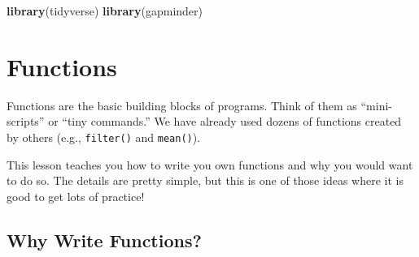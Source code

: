 \documentclass[
]{book}
\newenvironment{Shaded}{\begin{snugshade}}{\end{snugshade}}
\newcommand{\CommentTok}[1]{\textcolor[rgb]{0.56,0.35,0.01}{\textit{#1}}}
\newcommand{\DataTypeTok}[1]{\textcolor[rgb]{0.13,0.29,0.53}{#1}}
\newcommand{\DecValTok}[1]{\textcolor[rgb]{0.00,0.00,0.81}{#1}}
\newcommand{\KeywordTok}[1]{\textcolor[rgb]{0.13,0.29,0.53}{\textbf{#1}}}
\newcommand{\NormalTok}[1]{#1}
\newcommand{\OperatorTok}[1]{\textcolor[rgb]{0.81,0.36,0.00}{\textbf{#1}}}
\newcommand{\StringTok}[1]{\textcolor[rgb]{0.31,0.60,0.02}{#1}}
\begin{document}
\begin{Shaded}
\end{Shaded}

\begin{Shaded}
\begin{Highlighting}[]
\KeywordTok{library}\NormalTok{(tidyverse)}
\KeywordTok{library}\NormalTok{(gapminder)}
\end{Highlighting}
\end{Shaded}

\hypertarget{functions-1}{%
\section{Functions}\label{functions-1}}

Functions are the basic building blocks of programs. Think of them as ``mini-scripts'' or ``tiny commands.'' We have already used dozens of functions created by others (e.g., \texttt{filter()} and \texttt{mean()}).

This lesson teaches you how to write you own functions and why you would want to do so. The details are pretty simple, but this is one of those ideas where it is good to get lots of practice!

\hypertarget{why-write-functions}{%
\subsection{Why Write Functions?}\label{why-write-functions}}
\end{document}
